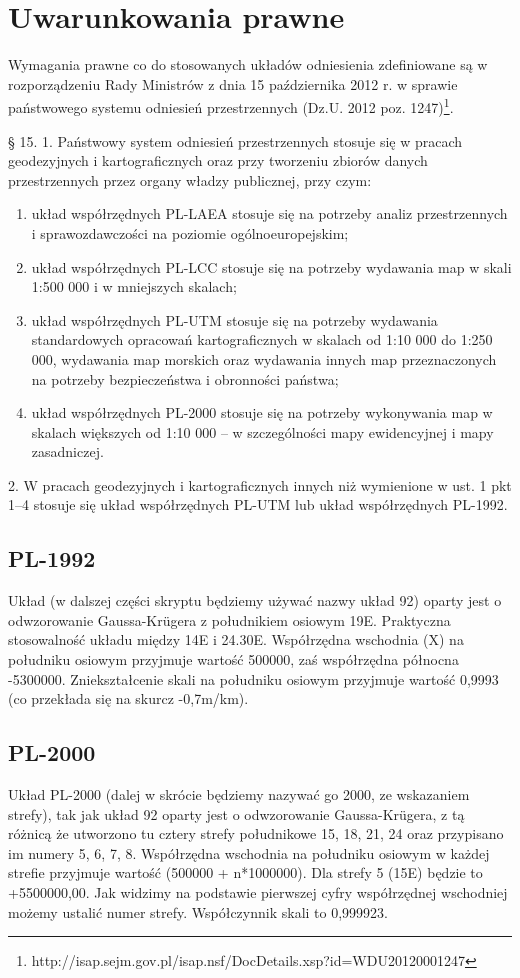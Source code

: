 \documentclass[a4paper,11pt, onecolumn, openany]{memoir}
\begin{document}
		\section{Uwarunkowania prawne}
		Wymagania prawne co do stosowanych układów odniesienia zdefiniowane są w rozporządzeniu Rady Ministrów z dnia 15 października 2012 r. w sprawie państwowego systemu odniesień przestrzennych (Dz.U. 2012 poz. 1247)\footnote{http://isap.sejm.gov.pl/isap.nsf/DocDetails.xsp?id=WDU20120001247}.
\begin{tcolorbox}[colback=black!5!white,colframe=white!55!black,title=§ 15. 1 i 2 rozporządzenia]
	§ 15. 1. Państwowy system odniesień przestrzennych stosuje się w pracach geodezyjnych i kartograficznych oraz przy
tworzeniu zbiorów danych przestrzennych przez organy władzy publicznej, przy czym:
\begin{enumerate}
	\item układ współrzędnych PL-LAEA stosuje się na potrzeby analiz przestrzennych i sprawozdawczości na poziomie ogólnoeuropejskim;
	\item układ współrzędnych PL-LCC stosuje się na potrzeby wydawania map w skali 1:500 000 i w mniejszych skalach;
	\item układ współrzędnych PL-UTM stosuje się na potrzeby wydawania standardowych opracowań kartograficznych w skalach od 1:10 000 do 1:250 000, wydawania map morskich oraz wydawania innych map przeznaczonych na potrzeby
	bezpieczeństwa i obronności państwa;
	\item układ współrzędnych PL-2000 stosuje się na potrzeby wykonywania map w skalach większych od 1:10 000 – w szczególności mapy ewidencyjnej i mapy zasadniczej.
\end{enumerate}
2. W pracach geodezyjnych i kartograficznych innych niż wymienione w ust. 1 pkt 1–4 stosuje się układ współrzędnych
PL-UTM lub układ współrzędnych PL-1992.
\end{tcolorbox}	
			\subsection{PL-1992}
			Układ (w dalszej części skryptu będziemy używać nazwy układ 92) oparty jest o odwzorowanie Gaussa-Kr\"ugera z południkiem osiowym 19E. Praktyczna stosowalność układu między 14E i 24.30E. Współrzędna wschodnia (X) na południku osiowym przyjmuje wartość 500000, zaś współrzędna północna -5300000. Zniekształcenie skali na południku osiowym przyjmuje wartość 0,9993 (co przekłada się na skurcz -0,7m/km).
			\subsection{PL-2000}
			Układ PL-2000 (dalej w skrócie będziemy nazywać go 2000, ze wskazaniem strefy), tak jak układ 92 oparty jest o odwzorowanie Gaussa-Kr\"ugera, z tą różnicą że utworzono tu cztery strefy południkowe 15, 18, 21, 24 oraz przypisano im numery 5, 6, 7, 8. Współrzędna wschodnia na południku osiowym w każdej strefie przyjmuje wartość (500000 + n*1000000). Dla strefy 5 (15E) będzie to +5500000,00. Jak widzimy na podstawie pierwszej cyfry współrzędnej wschodniej możemy ustalić numer strefy. Współczynnik skali to 0,999923. 
\end{document}
